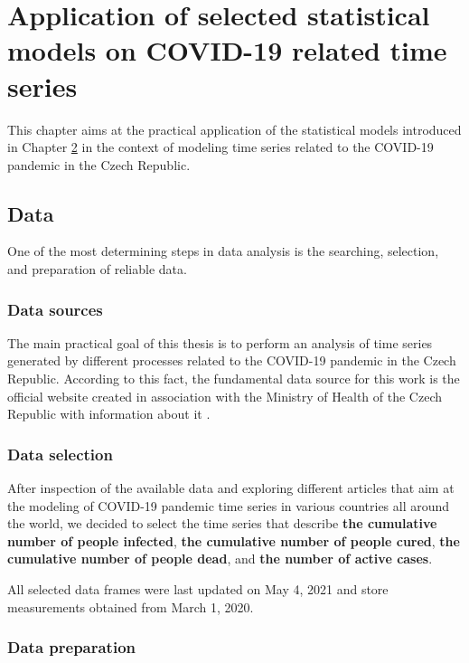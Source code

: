 \hypertarget{ch3}{\chapter{Application of selected statistical models on COVID-19 related time series}}

This chapter aims at the practical application of the statistical models introduced in Chapter \hyperlink{ch2}{2} in the context of modeling time series related to the COVID-19 pandemic in the Czech Republic.

\section{Data}

One of the most determining steps in data analysis is the searching, selection, and preparation of reliable data.

\subsection{Data sources}

The main practical goal of this thesis is to perform an analysis of time series generated by different processes related to the COVID-19 pandemic in the Czech Republic. According to this fact, the fundamental data source for this work is the official website created in association with the Ministry of Health of the Czech Republic with information about it \cite{covidczdata}.

\subsection{Data selection}

After inspection of the available data and exploring different articles that aim at the modeling of COVID-19 pandemic time series in various countries all around the world, we decided to select the time series that describe \textbf{the cumulative number of people infected}, \textbf{the cumulative number of people cured}, \textbf{the cumulative number of people dead}, and \textbf{the number of active cases}.

All selected data frames were last updated on May 4, 2021 and store measurements obtained from March 1, 2020. 

\subsection{Data preparation}

